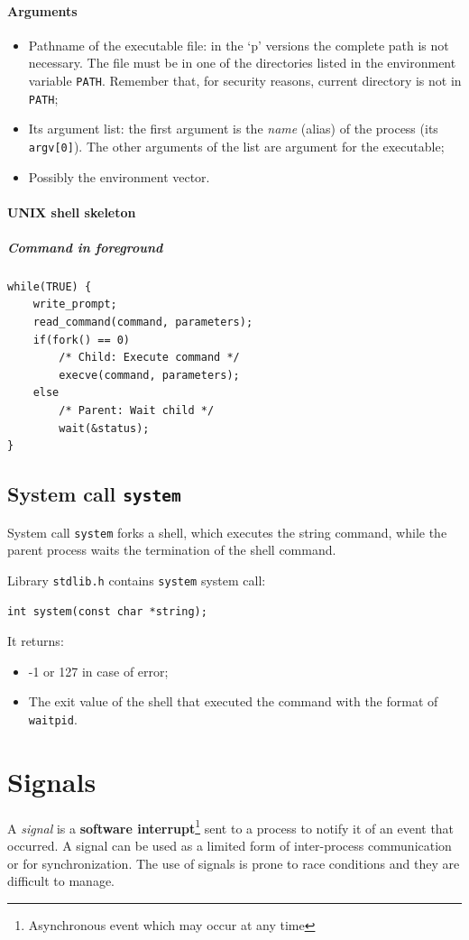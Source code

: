 \paragraph{Arguments}
\begin{itemize}
\item Pathname of the executable file: in the `p' versions the complete path is not necessary. The file must be in one of the directories listed in the environment variable \texttt{PATH}. Remember that, for security reasons, current directory is not in \texttt{PATH};
\item Its argument list: the first argument is the \textit{name} (alias) of the process (its \texttt{argv[0]}). The other arguments of the list are argument for the executable;
\item Possibly the environment vector.
\end{itemize}

\paragraph{UNIX shell skeleton}
\subparagraph{Command in foreground}
\begin{verbatim}
while(TRUE) {
    write_prompt;
    read_command(command, parameters);
    if(fork() == 0)
        /* Child: Execute command */
        execve(command, parameters);
    else
        /* Parent: Wait child */
        wait(&status);
}
\end{verbatim}

\subsection{System call \texttt{system}}
System call \texttt{system} forks a shell, which executes the string command, while the parent process waits the termination of the shell command.

Library \texttt{stdlib.h} contains \texttt{system} system call:
\begin{verbatim}
int system(const char *string);
\end{verbatim}

It returns:
\begin{itemize}
\item -1 or 127 in case of error;
\item The exit value of the shell that executed the command with the format of \texttt{waitpid}.
\end{itemize}

\section{Signals}
A \emph{signal} is a \textbf{software interrupt}\footnote{Asynchronous event which may occur at any time} sent to a process to notify it of an event that occurred. A signal can be used as a limited form of inter-process communication or for synchronization. The use of signals is prone to race conditions and they are difficult to manage.

